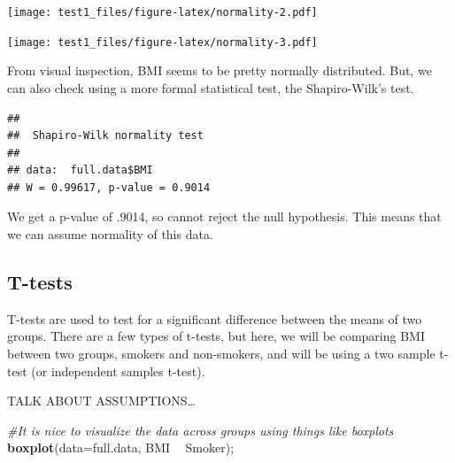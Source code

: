 \documentclass[
]{book}
\newenvironment{Shaded}{\begin{snugshade}}{\end{snugshade}}
\newcommand{\CommentTok}[1]{\textcolor[rgb]{0.56,0.35,0.01}{\textit{#1}}}
\newcommand{\DataTypeTok}[1]{\textcolor[rgb]{0.13,0.29,0.53}{#1}}
\newcommand{\KeywordTok}[1]{\textcolor[rgb]{0.13,0.29,0.53}{\textbf{#1}}}
\newcommand{\NormalTok}[1]{#1}
\newcommand{\OperatorTok}[1]{\textcolor[rgb]{0.81,0.36,0.00}{\textbf{#1}}}
\newcommand{\StringTok}[1]{\textcolor[rgb]{0.31,0.60,0.02}{#1}}
\begin{document}
\texttt{[image: test1\_files/figure-latex/normality-2.pdf]}

\begin{Shaded}
\end{Shaded}

\texttt{[image: test1\_files/figure-latex/normality-3.pdf]}

From visual inspection, BMI seems to be pretty normally distributed. But, we can also check using a more formal statistical test, the Shapiro-Wilk's test.

\begin{Shaded}
\end{Shaded}

\begin{verbatim}
## 
##  Shapiro-Wilk normality test
## 
## data:  full.data$BMI
## W = 0.99617, p-value = 0.9014
\end{verbatim}

We get a p-value of .9014, so cannot reject the null hypothesis. This means that we can assume normality of this data.

\hypertarget{t-tests}{%
\subsection{T-tests}\label{t-tests}}

T-tests are used to test for a significant difference between the means of two groups. There are a few types of t-tests, but here, we will be comparing BMI between two groups, smokers and non-smokers, and will be using a two sample t-test (or independent samples t-test).

TALK ABOUT ASSUMPTIONS\ldots{}

\begin{Shaded}
\begin{Highlighting}[]
\CommentTok{#It is nice to visualize the data across groups using things like boxplots}
\KeywordTok{boxplot}\NormalTok{(}\DataTypeTok{data=}\NormalTok{full.data, BMI }\OperatorTok{~}\StringTok{ }\NormalTok{Smoker);}
\end{Highlighting}
\end{Shaded}
\end{document}
